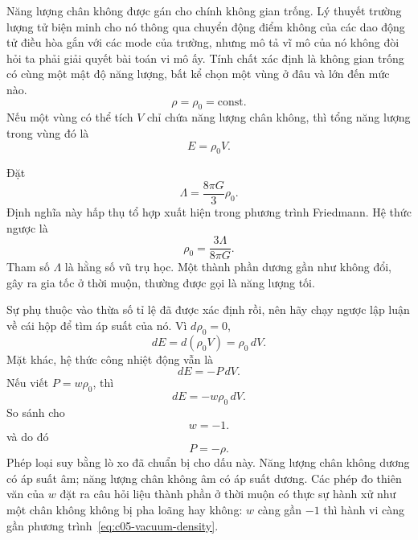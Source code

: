 Năng lượng chân không được gán cho chính không gian trống. Lý thuyết trường lượng tử biện minh cho nó thông qua chuyển động điểm không của các dao động tử điều hòa gắn với các mode của trường, nhưng mô tả vĩ mô của nó không đòi hỏi ta phải giải quyết bài toán vi mô ấy. Tính chất xác định là không gian trống có cùng một mật độ năng lượng, bất kể chọn một vùng ở đâu và lớn đến mức nào.
\begin{equation}
\rho=\rho_0=\text{const.}
\label{eq:c05-vacuum-density}
\end{equation}
Nếu một vùng có thể tích \(V\) chỉ chứa năng lượng chân không, thì tổng năng lượng trong vùng đó là
\begin{equation}
E=\rho_0 V.
\end{equation}
\begin{classroomqa}
\end{classroomqa}

Đặt
\begin{equation}
\Lambda=\frac{8\pi G}{3}\rho_0.
\label{eq:c05-lambda-definition}
\end{equation}
Định nghĩa này hấp thụ tổ hợp xuất hiện trong phương trình Friedmann. Hệ thức ngược là
\begin{equation}
\rho_0=\frac{3\Lambda}{8\pi G}.
\end{equation}
Tham số \(\Lambda\) là hằng số vũ trụ học. Một thành phần dương gần như không đổi, gây ra gia tốc ở thời muộn, thường được gọi là năng lượng tối.

Sự phụ thuộc vào thừa số tỉ lệ đã được xác định rồi, nên hãy chạy ngược lập luận về cái hộp để tìm áp suất của nó. Vì \(d\rho_0=0\),
\begin{equation}
dE=d(\rho_0V)=\rho_0\,dV.
\end{equation}
Mặt khác, hệ thức công nhiệt động vẫn là
\begin{equation}
dE=-P\,dV.
\end{equation}
Nếu viết \(P=w\rho_0\), thì
\begin{equation}
dE=-w\rho_0\,dV.
\end{equation}
So sánh cho
\begin{equation}
w=-1.
\end{equation}
và do đó
\begin{equation}
P=-\rho.
\end{equation}
Phép loại suy bằng lò xo đã chuẩn bị cho dấu này. Năng lượng chân không dương có áp suất âm; năng lượng chân không âm có áp suất dương. Các phép đo thiên văn của \(w\) đặt ra câu hỏi liệu thành phần ở thời muộn có thực sự hành xử như một chân không không bị pha loãng hay không: \(w\) càng gần \(-1\) thì hành vi càng gần phương trình~\eqref{eq:c05-vacuum-density}.

